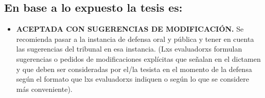 \subsection*{En base a lo expuesto la tesis es:}
\label{en-base-a-lo-expuesto-la-tesis-es}

\begin{itemize}
\tightlist
\item
  \textbf{ACEPTADA CON SUGERENCIAS DE MODIFICACIÓN.} Se recomienda pasar
  a la instancia de defensa oral y pública y tener en cuenta las
  sugerencias del tribunal en esa instancia. (Lxs evaluadorxs formulan
  sugerencias o pedidos de modificaciones explícitas que señalan en el
  dictamen y que deben ser consideradas por el/la tesista en el momento
  de la defensa según el formato que lxs evaluadorxs indiquen o según lo
  que se considere más conveniente).
\end{itemize}
